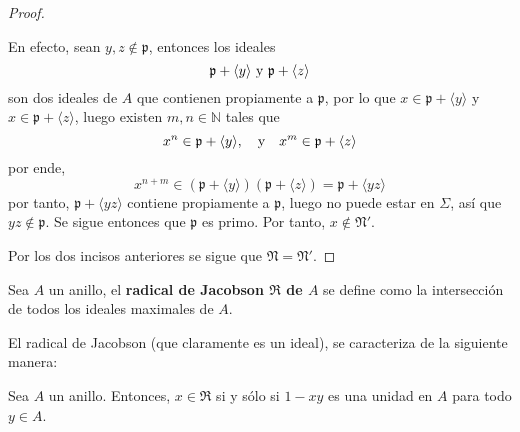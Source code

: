 \documentclass[12pt]{report}
\newcounter{it}
\theoremstyle{largebreak}
\begin{document}
\begin{proof}
\begin{itemize}
            En efecto, sean $y,z\notin\mathfrak{p}$, entonces los ideales
            \begin{equation*}
                \mathfrak{p}+\langle y\rangle\textup{ y }\mathfrak{p}+\langle z\rangle
            \end{equation*}
            son dos ideales de $A$ que contienen propiamente a $\mathfrak{p}$, por lo que $x\in\mathfrak{p}+\langle y\rangle$ y $x\in\mathfrak{p}+\langle z\rangle$, luego existen $m,n\in\mathbb{N}$ tales que
            \begin{equation*}
                x^n\in\mathfrak{p}+\langle y\rangle,\quad\textup{y}\quad x^m\in\mathfrak{p}+\langle z\rangle
            \end{equation*}
            por ende,
            \begin{equation*}
                x^{ n+m}\in\left(\mathfrak{p}+\langle y\rangle \right)\left(\mathfrak{p}+\langle z\rangle \right)=\mathfrak{p}+\langle yz\rangle
            \end{equation*}
            por tanto, $\mathfrak{p}+\langle yz\rangle$ contiene propiamente a $\mathfrak{p}$, luego no puede estar en $\Sigma$, así que $yz\notin\mathfrak{p}$. Se sigue entonces que $\mathfrak{p}$ es primo. Por tanto, $x\notin\mathfrak{N}'$.
        \end{itemize}
        Por los dos incisos anteriores se sigue que $\mathfrak{N}=\mathfrak{N}'$.
    \end{proof}

    \begin{mydef}
        Sea $A$ un anillo, el \textbf{radical de Jacobson $\mathfrak{R}$ de $A$} se define como la intersección de todos los ideales maximales de $A$.
    \end{mydef}

    El radical de Jacobson (que claramente es un ideal), se caracteriza de la siguiente manera:

    \begin{propo}
        Sea $A$ un anillo. Entonces, $x\in\mathfrak{R}$ si y sólo si $1-xy$ es una unidad en $A$ para todo $y\in A$.
    \end{propo}
\end{document}
